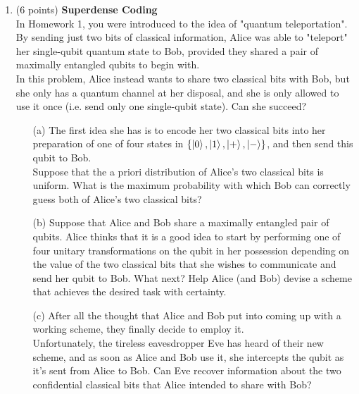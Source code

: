 \documentclass[12pt]{article}
\begin{document}
\begin{enumerate}
		




\item (6 points) \textbf{Superdense Coding}\\
In Homework 1, you were introduced to the idea of "quantum teleportation". By sending just two bits of classical information, Alice was able to "teleport" her single-qubit quantum state to Bob, provided they shared a pair of maximally entangled qubits to begin with. \\
In this problem, Alice instead wants to share two classical bits with Bob, but she only has a quantum channel at her disposal, and she is only allowed to use it once (i.e. send only one single-qubit state). Can she succeed? \\
\begin{enumerate}
\item[(a)] The first idea she has is to encode her two classical bits into her preparation of one of four states in $\{ \ket{0}, \ket{1}, \ket{+}, \ket{-}\}$, and then send this qubit to Bob. \\
Suppose that the a priori distribution of Alice's two classical bits is uniform. What is the maximum probability with which Bob can correctly guess both of Alice's two classical bits?\\
\item[(b)] Suppose that Alice and Bob share a maximally entangled pair of qubits. Alice thinks that it is a good idea to start by performing one of four unitary transformations on the qubit in her possession depending on the value of the two classical bits that she wishes to communicate and send her qubit to Bob. What next? Help Alice (and Bob) devise a scheme that achieves the desired task with certainty.\\
\item[(c)] After all the thought that Alice and Bob put into coming up with a working scheme, they finally decide to employ it.\\
Unfortunately, the tireless eavesdropper Eve has heard of their new scheme, and as soon as Alice and Bob use it, she intercepts the qubit as it's sent from Alice to Bob. Can Eve recover information about the two confidential classical bits that Alice intended to share with Bob?\\
\end{enumerate}



\end{enumerate}
\end{document}
